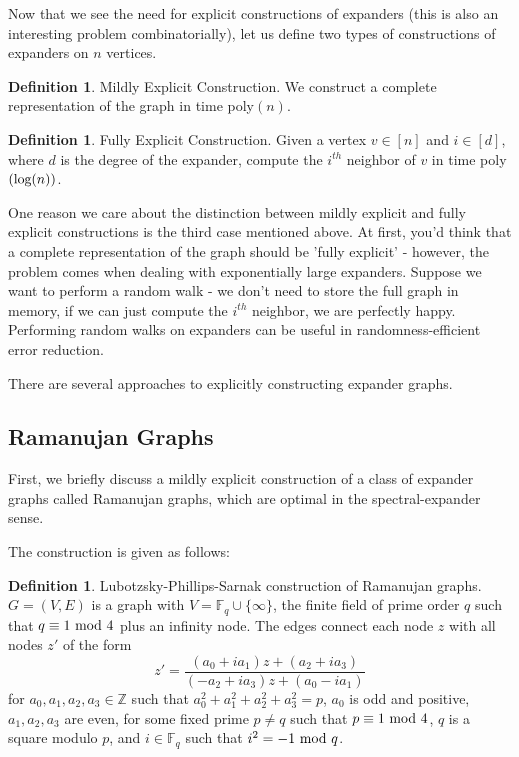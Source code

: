 \documentclass[11pt]{article}
\theoremstyle{definition}
\newtheorem{definition}[theorem]{Definition}
\theoremstyle{definition}
\theoremstyle{definition}
\newcommand{\txt}[1]
{\textnormal{#1}}
\begin{document}
Now that we see the need for explicit constructions of expanders (this is also an interesting problem combinatorially), let us define two types of constructions of expanders on $n$ vertices.

\begin{definition} Mildly Explicit Construction.
We construct a complete representation of the graph in time poly$(n)$. 
\end{definition}

\begin{definition} Fully Explicit Construction.
Given a vertex $v \in [n]$ and $i \in [d]$, where $d$ is the degree
of the expander, compute the $i^{th}$ neighbor of $v$ in time poly$(\txt{log}(n))$.
\end{definition}

One reason we care about the distinction between mildly explicit and fully explicit constructions is the third case mentioned above. At first, you'd think that a complete representation of the graph should be 'fully explicit' - however, the problem comes when dealing with exponentially large expanders. Suppose we want to perform a random walk - we don't need to store the full graph in memory, if we can just compute the $i^{th}$ neighbor, we are perfectly happy. Performing random walks on expanders can be useful in randomness-efficient error reduction.

There are several approaches to explicitly constructing expander graphs. 

\subsection{Ramanujan Graphs}

First, we briefly discuss a mildly explicit construction of a class of expander graphs called Ramanujan graphs, which are optimal in the spectral-expander sense. 

The construction is given as follows: 
\begin{definition} Lubotzsky-Phillips-Sarnak construction of Ramanujan graphs. \\
$G = (V, E)$ is a graph with $V = \mathbb{F}_q \cup \{\infty\}$, the finite field of prime order $q$ such that $q \equiv 1 \txt{ mod } 4$ plus an infinity node. The edges connect each node $z$ with all nodes $z'$ of the form 
\[
z' = \frac{(a_0 + ia_1)z + (a_2 + ia_3)}{(-a_2 + ia_3)z + (a_0 - ia_1)}
\]
for $a_0, a_1, a_2, a_3 \in \mathbb{Z}$ such that $a_0^2 + a_1^2 + a_2^2 + a_3^2 = p$, $a_0$ is odd and positive, $a_1, a_2, a_3$ are even, for some fixed prime $p \neq q$ such that $p \equiv 1 \txt{ mod } 4$, $q$ is a square modulo $p$, and $i \in \mathbb{F}_q$ such that $i^2 = -1 \txt{ mod } q$. 
\end{definition}
\end{document}
